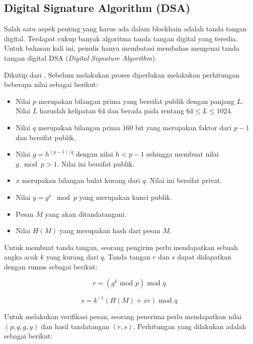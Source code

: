 \documentclass[10pt,conference]{IEEEtran}
\theoremstyle{definition}
\begin{document}
\subsection{Digital Signature Algorithm (DSA)}
Salah satu aspek penting yang harus ada dalam blockhain adalah tanda tangan digital. Terdapat cukup banyak algoritma tanda tangan digital yang teredia. Untuk bahasan kali ini, penulis hanya membatasi membahas mengenai tanda tangan digital DSA (\emph{Digital Signature Algorithm}).

Dikutip dari \cite{b1}, Sebelum melakukan proses diperlukan melakukan perhitungan beberapa nilai sebagai berikut: 
\begin{itemize}
    \item Nilai $p$ merupakan bilangan prima yang bersifat publik dengan panjang $L$.  Nilai $L$ haruslah kelipatan 64 dan berada pada rentang $64 \le L \le 1024$. 
    \item Nilai $q$ merupakan bilangan prima 160 bit yang merupakan faktor dari $p - 1$ dan bersifat publik.
    \item Nilai $g = h ^ {(p-1)/q}$ dengan nilai $h < p - 1$ sehingga membuat nilai $g \mod p > 1$. Nilai ini bersifat publik.
    \item $x$ merupakan bilangan bulat kurang dari $q$.  Nilai ini bersifat privat.
    \item Nilai $y = g^x \mod p$ yang merupakan kunci publik.
    \item Pesan $M$ yang akan ditandatangani.
    \item Nilai $H(M)$ yang merupakan hash dari pesan $M$.
\end{itemize}

Untuk membuat tanda tangan, seorang pengirim perlu mendapatkan sebuah angka acak $k$ yang kurang dari $q$. Tanda tangan $r$ dan $s$ dapat didapatkan dengan rumus sebagai berikut: \cite{b1}

\begin{equation} \label{eq:dsa1} 
    r = (g^k \text{ mod } p) \text{ mod } q
\end{equation}

\begin{equation} \label{eq:dsa2} 
    s = k^{-1}(H(M) + xr) \text{ mod } q
\end{equation}

Untuk melakukan verifikasi pesan, seorang penerima perlu mendapatkan nilai $(p,q,g,y)$ dan hasil tandatangan $(r,s)$. Perhitungan yang dilakukan adalah sebagai berikut: \cite{b1}
\end{document}
